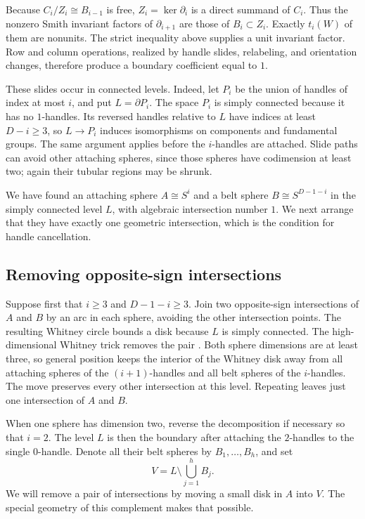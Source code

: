 Because $C_i/Z_i\cong B_{i-1}$ is free, $Z_i=\ker\partial_i$ is
a direct summand of $C_i$.  Thus the nonzero Smith invariant factors
of $\partial_{i+1}$ are those of $B_i\subset Z_i$.  Exactly $t_i(W)$
of them are nonunits.  The strict inequality above supplies a unit
invariant factor.  Row and column operations, realized by handle slides,
relabeling, and orientation changes, therefore produce a boundary
coefficient equal to $1$.

These slides occur in connected levels.  Indeed, let $P_i$ be the union
of handles of index at most $i$, and put $L=\partial P_i$.
The space $P_i$ is simply connected because it has no $1$-handles.
Its reversed handles relative to $L$ have indices at least $D-i\geq3$,
so $L\to P_i$ induces isomorphisms on components and fundamental groups.
The same argument applies before the $i$-handles are attached.
Slide paths can avoid other attaching spheres, since those spheres have
codimension at least two; again their tubular regions may be shrunk.

We have found an attaching sphere $A\cong S^i$ and a belt sphere
$B\cong S^{D-1-i}$ in the simply connected level $L$, with algebraic
intersection number $1$.  We next arrange that they have exactly one
geometric intersection, which is the condition for handle cancellation.

\subsection{Removing opposite-sign intersections}

Suppose first that $i\geq3$ and $D-1-i\geq3$.
Join two opposite-sign intersections of $A$ and $B$ by an arc in each
sphere, avoiding the other intersection points.  The resulting Whitney
circle bounds a disk because $L$ is simply connected.
The high-dimensional Whitney trick removes the pair
\cite[Theorem~6.6]{Milnor1965}.
Both sphere dimensions are at least three, so general position keeps
the interior of the Whitney disk away from all attaching spheres of
the $(i+1)$-handles and all belt spheres of the $i$-handles.
The move preserves every other intersection at this level.
Repeating leaves just one intersection of $A$ and $B$.

When one sphere has dimension two, reverse the decomposition if
necessary so that $i=2$.  The level $L$ is then the boundary after
attaching the $2$-handles to the single $0$-handle.  Denote all their
belt spheres by $B_1,\ldots,B_h$, and set
\[
 V=L\setminus\bigcup_{j=1}^h B_j.
\]
We will remove a pair of intersections by moving a small disk in $A$
into $V$.  The special geometry of this complement makes that possible.

